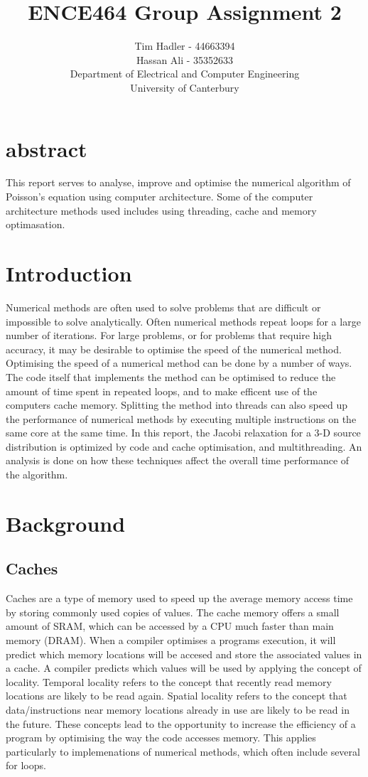 \documentclass[a4paper, 12pt]{article}
\title{\vspace{-1cm} ENCE464 Group Assignment 2}
\author{Tim Hadler - 44663394 \\ Hassan Ali -  35352633\\
	\small Department of Electrical and Computer Engineering\\
	\small University of Canterbury}
\begin{document}
\maketitle

\section{abstract}

This report serves to analyse, improve and optimise the numerical algorithm of Poisson's equation using computer architecture. Some of the computer architecture methods used includes using threading, cache and memory optimasation.

\pagebreak
	
\section{Introduction}
	Numerical methods are often used to solve problems that are difficult or impossible to solve analytically. Often numerical methods repeat loops for a large number of iterations. For large problems, or for problems that require high accuracy, it may be desirable to optimise the speed of the numerical method. Optimising the speed of a numerical method can be done by a number of ways. The code itself that implements the method can be optimised to reduce the amount of time spent in repeated loops, and to make efficent use of the computers cache memory. Splitting the method into threads can also speed up the performance of numerical methods by executing multiple instructions on the same core at the same time. In this report, the Jacobi relaxation for a 3-D source distribution is optimized by code and cache optimisation, and multithreading. An analysis is done on how these techniques affect the overall time performance of the algorithm. 
	

\section{Background}

\subsection{Caches}
Caches are a type of memory used to speed up the average memory access time by storing commonly used copies of values. The cache memory offers a small amount of SRAM, which can be accessed by a CPU much faster than main memory (DRAM). When a compiler optimises a programs execution, it will predict which memory locations will be accesed and store the associated values in a cache. A compiler predicts which values will be used by applying the concept of locality. Temporal locality refers to the concept that recently read memory locations are likely to be read again. Spatial locality refers to the concept that data/instructions near memory locations already in use are likely to be read in the future. These concepts lead to the opportunity to increase the efficiency of a program by optimising the way the code accesses memory. This applies particularly to implemenations of numerical methods, which often include several for loops. 
\end{document}
